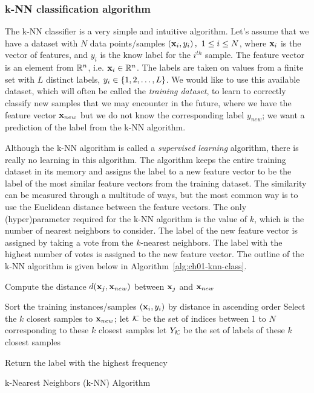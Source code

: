 \subsubsection{k-NN classification algorithm}
The k-NN classifier is a very simple and intuitive algorithm. Let's assume that we have a dataset with $N$ data points/samples $\left( \mathbf{x}_i, y_i\right), \,\, 1 \leq i \leq N$, where $\mathbf{x}_i$ is the vector of features, and $y_i$ is the know label for the $i^{th}$ sample. The feature vector is an element from $\mathbb{R}^n$, i.e. $\mathbf{x}_i \in \mathbb{R}^n$. The labels are taken on values from a finite set with $L$ distinct labels, $y_i \in \left\{ 1, 2, \ldots, L\right\}$. We would like to use this available dataset, which will often be called the \textit{training dataset}, to learn to correctly classify new samples that we may encounter in the future, where we have the feature vector $\mathbf{x}_{new}$ but we do not know the corresponding label $y_{new}$; we want a prediction of the label from the k-NN algorithm. 

Although the k-NN algorithm is called a \textit{supervised learning} algorithm, there is really no learning in this algorithm. The algorithm keeps the entire training dataset in its memory and assigns the label to a new feature vector to be the label of the most similar feature vectors from the training dataset. The similarity can be measured through a multitude of ways, but the most common way is to use the Euclidean distance between the feature vectors. The only (hyper)parameter required for the k-NN algorithm is the value of $k$, which is the number of nearest neighbors to consider. The label of the new feature vector is assigned by taking a vote from the $k$-nearest neighbors. The label with the highest number of votes is assigned to the new feature vector. The outline of the k-NN algorithm is given below in Algorithm~\ref{alg:ch01-knn-class}.

\begin{boxedstuff}
\begin{algorithm}[H]
    \SetAlgoLined
    
    \BlankLine
     {
        Compute the distance $d(\mathbf{x}_j, \mathbf{x}_{new})$ between $\mathbf{x}_j$ and $\mathbf{x}_{new}$\;
    }
    
    Sort the training instances/samples $\left( \mathbf{x}_i, y_i\right)$ by distance in ascending order\;
    Select the $k$ closest samples to $\mathbf{x}_{new}$; let $\mathcal{K}$ be the set of indices between 1 to $N$ corresponding to these $k$ closest samples\; let $Y_{\mathcal{K}}$ be the set of labels of these $k$ closest samples\;
    \BlankLine
    
    Return the label with the highest frequency\;
    \caption{k-Nearest Neighbors (k-NN) Algorithm}
    \label{alg:ch01-knn-class}
\end{algorithm}
\end{boxedstuff}


